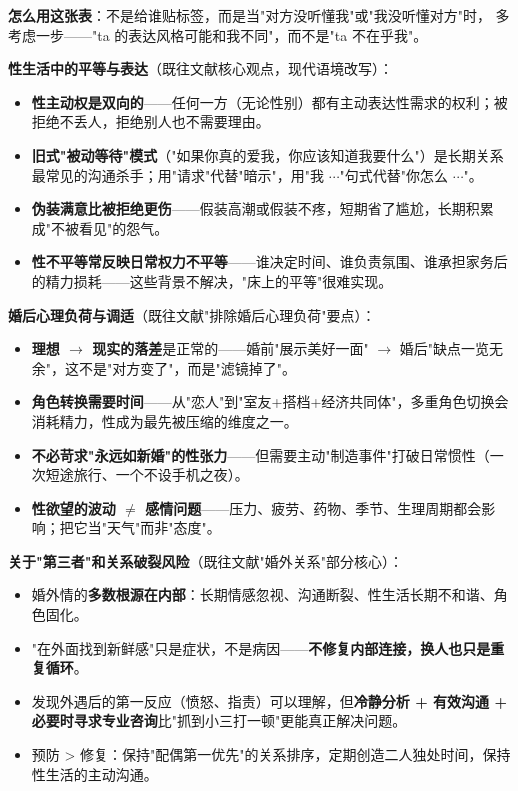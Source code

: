 \documentclass[12pt,UTF8,openany]{ctexbook}
\begin{document}
\vspace{0.5em}
\noindent\textbf{怎么用这张表}：不是给谁贴标签，而是当"对方没听懂我"或"我没听懂对方"时，
多考虑一步——"ta 的表达风格可能和我不同"，而不是"ta 不在乎我"。

\textbf{性生活中的平等与表达}（既往文献核心观点，现代语境改写）：

\begin{itemize}[leftmargin=2em,itemsep=0.3em]
  \item \textbf{性主动权是双向的}——任何一方（无论性别）都有主动表达性需求的权利；被拒绝不丢人，拒绝别人也不需要理由。
  \item \textbf{旧式"被动等待"模式}（"如果你真的爱我，你应该知道我要什么"）是长期关系最常见的沟通杀手；用"请求"代替"暗示"，用"我 $\cdots$"句式代替"你怎么 $\cdots$"。
  \item \textbf{伪装满意比被拒绝更伤}——假装高潮或假装不疼，短期省了尴尬，长期积累成"不被看见"的怨气。
  \item \textbf{性不平等常反映日常权力不平等}——谁决定时间、谁负责氛围、谁承担家务后的精力损耗——这些背景不解决，"床上的平等"很难实现。
\end{itemize}

\textbf{婚后心理负荷与调适}（既往文献"排除婚后心理负荷"要点）：

\begin{itemize}[leftmargin=2em,itemsep=0.3em]
  \item \textbf{理想 $\to$ 现实的落差}是正常的——婚前"展示美好一面" $\to$ 婚后"缺点一览无余"，这不是"对方变了"，而是"滤镜掉了"。
  \item \textbf{角色转换需要时间}——从"恋人"到"室友+搭档+经济共同体"，多重角色切换会消耗精力，性成为最先被压缩的维度之一。
  \item \textbf{不必苛求"永远如新婚"的性张力}——但需要主动"制造事件"打破日常惯性（一次短途旅行、一个不设手机之夜）。
  \item \textbf{性欲望的波动 $\ne$ 感情问题}——压力、疲劳、药物、季节、生理周期都会影响；把它当"天气"而非"态度"。
\end{itemize}

\textbf{关于"第三者"和关系破裂风险}（既往文献"婚外关系"部分核心）：

\begin{itemize}[leftmargin=2em,itemsep=0.3em]
  \item 婚外情的\textbf{多数根源在内部}：长期情感忽视、沟通断裂、性生活长期不和谐、角色固化。
  \item "在外面找到新鲜感"只是症状，不是病因——\textbf{不修复内部连接，换人也只是重复循环}。
  \item 发现外遇后的第一反应（愤怒、指责）可以理解，但\textbf{冷静分析 + 有效沟通 + 必要时寻求专业咨询}比"抓到小三打一顿"更能真正解决问题。
  \item 预防 > 修复：保持"配偶第一优先"的关系排序，定期创造二人独处时间，保持性生活的主动沟通。
\end{itemize}
\end{document}
